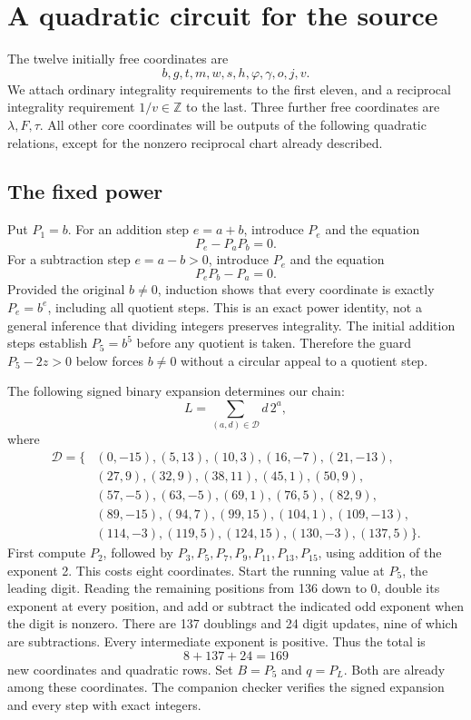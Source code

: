 \documentclass[11pt]{article}
\newcommand{\Z}{\mathbb Z}
\begin{document}
\section{A quadratic circuit for the source}
The twelve initially free coordinates are
\begin{equation}\label{free12}
 b,g,t,m,w,s,h,\varphi,\gamma,o,j,v.
\end{equation}
We attach ordinary integrality requirements to the first eleven, and a
reciprocal integrality requirement \(1/v\in\Z\) to the last. Three
further free coordinates are \(\lambda,F,\tau\). All other core
coordinates will be outputs of the following quadratic relations, except
for the nonzero reciprocal chart already described.

\subsection{The fixed power}
Put \(P_1=b\). For an addition step \(e=a+b\), introduce \(P_e\)
and the equation
\[
 P_e-P_aP_b=0.
\]
For a subtraction step \(e=a-b>0\), introduce \(P_e\) and the equation
\[
 P_eP_b-P_a=0.
\]
Provided the original \(b\ne0\), induction shows that every coordinate
is exactly \(P_e=b^e\), including all quotient steps. This is an exact
power identity, not a general inference that dividing integers preserves
integrality. The initial addition steps establish $P_5=b^5$ before any quotient
is taken. Therefore the guard $P_5-2z>0$ below forces $b\ne0$
without a circular appeal to a quotient step.

The following signed binary expansion determines our chain:
\[
 L=\sum_{(a,d)\in\mathcal D} d\,2^a,
\]
where
\begin{align*}
\mathcal D=\{&(0,-15),(5,13),(10,3),(16,-7),(21,-13),\\
 &(27,9),(32,9),(38,11),(45,1),(50,9),\\
 &(57,-5),(63,-5),(69,1),(76,5),(82,9),\\
 &(89,-15),(94,7),(99,15),(104,1),(109,-13),\\
 &(114,-3),(119,5),(124,15),(130,-3),(137,5)\}.
\end{align*}
First compute \(P_2\), followed by
\(P_3,P_5,P_7,P_9,P_{11},P_{13},P_{15}\), using addition of the
exponent 2. This costs eight coordinates. Start the running value at
\(P_5\), the leading digit. Reading the remaining positions from 136
down to 0, double its exponent at every position, and add or subtract
the indicated odd exponent when the digit is nonzero. There are 137
doublings and 24 digit updates, nine of which are subtractions.
Every intermediate exponent is positive. Thus the total is
\[
 8+137+24=169
\]
new coordinates and quadratic rows. Set \(B=P_5\) and \(q=P_L\).
Both are already among these coordinates. The companion checker verifies
the signed expansion and every step with exact integers.
\end{document}
